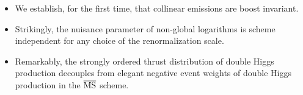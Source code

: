 \begin{itemize}
  \item We establish, for the first time, that collinear emissions are boost invariant.
  \item Strikingly, the nuisance parameter of non-global logarithms is scheme independent for any choice of the renormalization scale.
  \item Remarkably, the strongly ordered thrust distribution of double Higgs production decouples from elegant negative event weights of double Higgs production in the $\overline{\rm MS}$ scheme.
\end{itemize}

